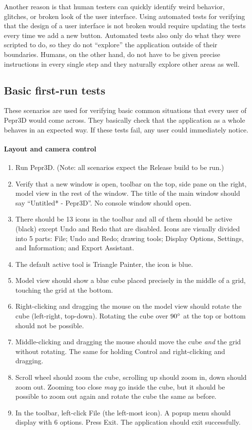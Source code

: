 Another reason is that human testers can quickly identify weird behavior, glitches, or broken look of the user interface.
Using automated tests for verifying that the design of a user interface is not broken would require updating the tests every time we add a new button.
Automated tests also only do what they were scripted to do, so they do not ``explore'' the application outside of their boundaries.
Humans, on the other hand, do not have to be given precise instructions in every single step and they naturally explore other areas as well.

\subsection{Basic first-run tests}

These scenarios are used for verifying basic common situations that every user of Pepr3D would come across.
They basically check that the application as a whole behaves in an expected way.
If these tests fail, any user could immediately notice.

\paragraph{Layout and camera control}

\begin{enumerate}
\item Run Pepr3D. (Note: all scenarios expect the Release build to be run.)
\item Verify that a new window is open, toolbar on the top, side pane on the right, model view in the rest of the window. The title of the main window should say ``Untitled* - Pepr3D''. No console window should open.
\item There should be 13 icons in the toolbar and all of them should be active (black) except Undo and Redo that are disabled. Icons are visually divided into 5 parts: File; Undo and Redo; drawing tools; Display Options, Settings, and Information; and Export Assistant.
\item The default active tool is Triangle Painter, the icon is blue.
\item Model view should show a blue cube placed precisely in the middle of a grid, touching the grid at the bottom.
\item Right-clicking and dragging the mouse on the model view should rotate the cube (left-right, top-down). Rotating the cube over $90\degree$ at the top or bottom should not be possible.
\item Middle-clicking and dragging the mouse should move the cube \emph{and} the grid without rotating. The same for holding Control and right-clicking and dragging.
\item Scroll wheel should zoom the cube, scrolling up should zoom in, down should zoom out. Zooming too close \emph{may} go inside the cube, but it should be possible to zoom out again and rotate the cube the same as before.
\item In the toolbar, left-click File (the left-most icon). A popup menu should display with 6 options. Press Exit. The application should exit successfully.
\end{enumerate}


